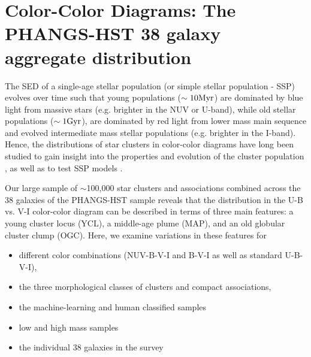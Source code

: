\documentclass[linenumbers]{aastex63}
\begin{document}
\section{Color-Color Diagrams: The PHANGS-HST 38 galaxy aggregate distribution}\label{sect:color_color}
The SED of a single-age stellar population (or simple stellar population - SSP) evolves over time such that young populations ($\sim 10 {\rm Myr}$) are dominated by blue light from massive stars (e.g. brighter in the NUV or U-band), while old stellar populations ($\sim 1 {\rm Gyr}$), are dominated by red light from lower mass main sequence and evolved intermediate mass stellar populations (e.g. brighter in the I-band).  
Hence, the distributions of star clusters in color-color diagrams {have long been} studied to gain insight into the properties and evolution of the cluster population 
\citep[e.g.,][]{van_den_bergh_ubv_1968,searle_classification_1980,
girardi_age_1995, larsen_young_1999, chandar_luminosity_2010, adamo_legacy_2017}, 
{as well as to test SSP models \citep[e.g.,][]{bruzual_stellar_2003,vazquez_optimization_2005,maraston_evolutionary_1998}.}






{Our large sample of $\sim$100,000 star clusters and associations combined across the 38 galaxies of the PHANGS-HST sample reveals that the distribution in the U-B vs. V-I color-color diagram} can be described in terms of three main features: a young cluster locus (YCL), a middle-age plume (MAP), and an old globular cluster clump (OGC).   Here, we examine variations in these features for 
\begin{itemize}
\item different color combinations (NUV-B-V-I and B-V-I as well as standard U-B-V-I), 
\item the three morphological classes of clusters and compact associations, 
\item the machine-learning and human classified samples
\item low and high mass samples
\item the individual 38 galaxies in the survey
\end{itemize}
\end{document}
